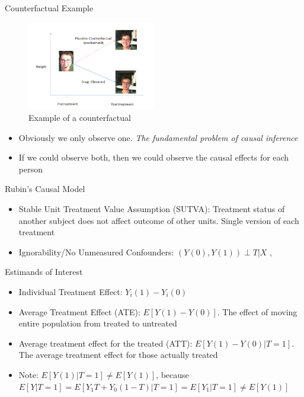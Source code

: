   
\begin{frame}{Counterfactual Example}
   \begin{figure}[h!]
  \centering
    \includegraphics[width=0.5\textwidth]{counterfactual.png}
    \caption{Example of a counterfactual}
\label{fig:counterfactual}
\end{figure}

\begin{itemize}
 \item Obviously we only observe one. \textit{The fundamental problem of causal inference}
\item If we could observe both, then we could observe the causal effects for each person
\end{itemize}
\end{frame}


\begin{frame}{Rubin's Causal Model}
\begin{itemize}
\item Stable Unit Treatment Value Assumption (SUTVA): Treatment status of another subject does not affect outcome of other units. Single version of each treatment
\item Ignorability/No Unmeasured Confounders: $(Y(0),Y(1))\perp T|X$ ,\cite{Rosenbaum1983}
\end{itemize}
\end{frame}




\begin{frame}{Estimands of Interest}
 \begin{itemize}
 \item Individual Treatment Effect: $Y_i(1)-Y_i(0)$
 \item Average Treatment Effect (ATE): $E[Y(1)-Y(0)]$. The effect of moving entire population
 from treated to untreated
 \item Average treatment effect for the treated (ATT): $E[Y(1)-Y(0)|T=1]$. The average treatment
 effect for those actually treated
 \item Note:  $E[Y(1)|T=1]\neq E[Y(1)]$, because $E[Y|T=1]=E[Y_1T+Y_0(1-T)|T=1]=E[Y_1|T=1]\neq E[Y(1)]$
\end{itemize}
 
\end{frame}


